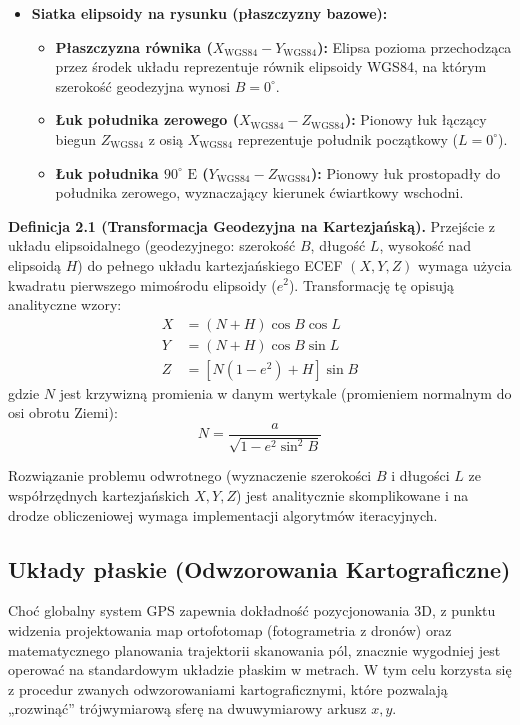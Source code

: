 \begin{itemize}
    \item \textbf{Siatka elipsoidy na rysunku (płaszczyzny bazowe):}
    \begin{itemize}
        \item \textbf{Płaszczyzna równika ($X_{\text{WGS84}} - Y_{\text{WGS84}}$):} Elipsa pozioma przechodząca przez środek układu reprezentuje równik elipsoidy WGS84, na którym szerokość geodezyjna wynosi $B = 0^\circ$.
        \item \textbf{Łuk południka zerowego ($X_{\text{WGS84}} - Z_{\text{WGS84}}$):} Pionowy łuk łączący biegun $Z_{\text{WGS84}}$ z osią $X_{\text{WGS84}}$ reprezentuje południk początkowy ($L = 0^\circ$).
        \item \textbf{Łuk południka $90^\circ\text{ E}$ ($Y_{\text{WGS84}} - Z_{\text{WGS84}}$):} Pionowy łuk prostopadły do południka zerowego, wyznaczający kierunek ćwiartkowy wschodni.
    \end{itemize}
\end{itemize}

\textbf{Definicja 2.1 (Transformacja Geodezyjna na Kartezjańską).} 
Przejście z układu elipsoidalnego (geodezyjnego: szerokość $B$, długość $L$, wysokość nad elipsoidą $H$) do pełnego układu kartezjańskiego ECEF $(X, Y, Z)$ wymaga użycia kwadratu pierwszego mimośrodu elipsoidy ($e^2$). Transformację tę opisują analityczne wzory:
\begin{align}
    X &= (N + H) \cos B \cos L \\
    Y &= (N + H) \cos B \sin L \\
    Z &= \left[N(1 - e^2) + H\right] \sin B
\end{align}
gdzie $N$ jest krzywizną promienia w danym wertykale (promieniem normalnym do osi obrotu Ziemi):
\begin{equation}
    N = \frac{a}{\sqrt{1 - e^2 \sin^2 B}}
\end{equation}

Rozwiązanie problemu odwrotnego (wyznaczenie szerokości $B$ i długości $L$ ze współrzędnych kartezjańskich $X, Y, Z$) jest analitycznie skomplikowane i na drodze obliczeniowej wymaga implementacji algorytmów iteracyjnych.

\subsection{Układy płaskie (Odwzorowania Kartograficzne)}
Choć globalny system GPS zapewnia dokładność pozycjonowania 3D, z punktu widzenia projektowania map ortofotomap (fotogrametria z dronów) oraz matematycznego planowania trajektorii skanowania pól, znacznie wygodniej jest operować na standardowym układzie płaskim w metrach. W tym celu korzysta się z procedur zwanych odwzorowaniami kartograficznymi, które pozwalają „rozwinąć” trójwymiarową sferę na dwuwymiarowy arkusz $x, y$. 

